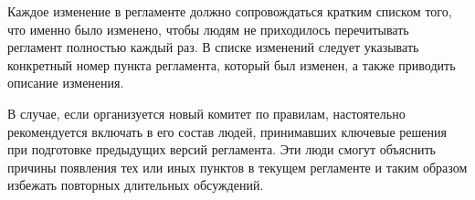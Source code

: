 Каждое изменение в регламенте должно сопровождаться кратким списком того, что именно было изменено, чтобы людям не приходилось перечитывать регламент полностью каждый раз. В списке изменений следует указывать конкретный номер пункта регламента, который был изменен, а также приводить описание изменения.

В случае, если организуется новый комитет по правилам, настоятельно рекомендуется включать в его состав людей, принимавших ключевые решения при подготовке предыдущих версий регламента. Эти люди смогут объяснить причины появления тех или иных пунктов в текущем регламенте и таким образом избежать повторных длительных обсуждений.
